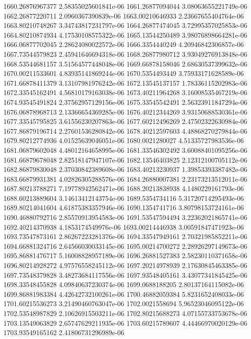 {1660.26876967377 2.58355025601841e-06
1661.26877094044 3.08063655221749e-06
1662.26877220711 2.0960367390839e-06
1663.00210646933 2.23667655404764e-06
1663.80210748267 3.34743817231797e-06
1664.26877474045 3.72995357025853e-06
1664.80210874934 4.17530108575322e-06
1665.13544250489 3.98076898664281e-06
1666.06877702045 2.28624080022572e-06
1666.3354440249 4.20946842306857e-06
1667.73544579823 2.45941646694318e-06
1668.26877980712 3.93049276913848e-06
1668.53544681157 3.51564577448048e-06
1669.66878158046 2.68630537399632e-06
1670.00211533601 4.83935141869244e-06
1670.5354493449 3.75933171628589e-06
1671.66878411379 3.13107981976242e-06
1672.13545137157 1.78336115202983e-06
1672.33545162491 4.56810179163038e-06
1673.40211964268 3.16008535467219e-06
1674.93545491824 2.37562957129156e-06
1675.33545542491 2.56323911847294e-06
1676.06878968713 2.13366654369285e-06
1676.40212344269 3.93150688530361e-06
1677.33545795825 3.61556230207863e-06
1677.60212496269 2.47502322630984e-06
1677.86879196714 2.27601536280842e-06
1678.40212597603 4.48868270279844e-06
1679.80212774936 4.01525639046051e-06
1680.0021280027 4.51335727983536e-06
1681.06879602048 4.48012164658995e-06
1681.33546302492 3.60088401095256e-06
1681.66879678048 2.82518147947107e-06
1682.13546403825 2.12312100705112e-06
1682.86879830048 2.37030842389608e-06
1683.40213230937 1.39853393387482e-06
1683.66879931381 4.02826305288576e-06
1684.26880007381 2.23173213512011e-06
1687.80213788271 7.19778942562471e-06
1688.20213838938 4.1480229161793e-06
1688.60213889604 3.14613412143754e-06
1689.5354734116 5.31720714295493e-06
1689.80214041604 4.61875383357946e-06
1690.1354741716 3.80798153724161e-06
1690.46880792716 2.85570913954583e-06
1691.53547594494 3.22362021865741e-06
1692.40214370938 4.1853174549976e-06
1693.00214446938 3.00591847471923e-06
1693.73547873161 2.86267223281376e-06
1694.33547949161 2.70321985852211e-06
1694.66881324716 2.64566030033145e-06
1695.00214700272 2.28926297149673e-06
1695.86881476717 5.16008828957189e-06
1696.26881527383 2.58230110371658e-06
1696.80214928272 4.97576558245112e-06
1697.20214978939 2.17630845463385e-06
1697.73548379828 3.48273684117556e-06
1697.93548405161 3.43077341845425e-06
1698.33548455828 4.09840637230374e-06
1699.0688188205 2.80137164115082e-06
1699.86881983384 4.42642732100261e-06
1700.46882059384 5.8231652408033e-06
1701.60215536273 3.21490460763047e-06
1702.0021558694 5.96523046095122e-06
1702.53548987829 2.10626915503211e-06
1702.80215688273 4.07155733753678e-06
1703.13549063829 2.65747629211935e-06
1703.60215789607 4.44466970020129e-06
1703.93549165162 2.41806731296989e-06
}
